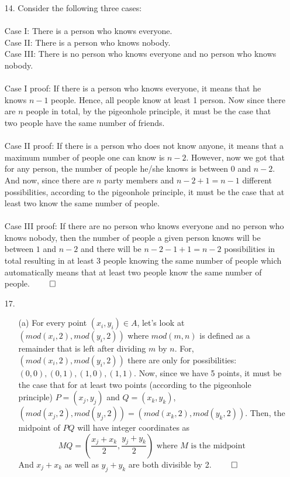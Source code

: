 \documentclass[12pt, a4paper]{article}
\begin{document}
\begin{itemize}
\item[]

\item[14.]
Consider the following three cases:\\\\
Case I: There is a person who knows everyone.\\
Case II: There is a person who knows nobody.\\
Case III: There is no person who knows everyone and no person who knows nobody.
\\\\
Case I proof: If there is a person who knows everyone, it means that he knows $n - 1$ people. Hence, all people know at least 1 person. Now since there are $n$ people in total, by the pigeonhole principle, it must be the case that two people have the same number of friends. \\\\
Case II proof: If there is a person who does not know anyone, it means that a maximum number of people one can know is $n - 2$. However, now we got that for any person, the number of people he/she knows is between
0 and $n - 2$. And now, since there are $n$ party members and $n - 2 + 1 = n - 1$ different possibilities, according to the pigeonhole principle, it must be the case that at least two know the same number of people.
\\\\
Case III proof: If there are no person who knows everyone and no person who knows nobody, then the number of people a given person knows will be between $1$ and $n - 2$ and there will be $n - 2 - 1 + 1 = n - 2$ possibilities in total
resulting in at least 3 people knowing the same number of people which automatically means that at least two people know the same number of people.
$\qed$

\item[]

\item[17.]
\begin{itemize}
\item[(a)]
For every point $(x_i, y_i) \in A$, let's look at $(mod(x_i, 2), mod(y_i, 2))$
where $mod(m,n)$ is defined as a remainder that is left after dividing $m$ by $n$.
For, $(mod(x_i, 2), mod(y_i, 2))$ there are only for possibilities: $(0, 0), (0, 1), (1, 0), (1, 1)$.
Now, since we have 5 points, it must be the case that for at least two points (according to the pigeonhole principle)
$P = (x_j, y_j)$ and $Q = (x_k, y_k)$, $(mod(x_j, 2), mod(y_j, 2)) = (mod(x_k, 2), mod(y_k, 2))$. Then, the midpoint
of $PQ$ will have integer coordinates as
$$MQ = (\dfrac{x_j + x_k}{2}, \dfrac{y_j + y_k}{2}) \mbox{ where $M$ is the midpoint}$$
And $x_j + x_k$ as well as $y_j + y_k$ are both divisible by 2.
$\qed$
\end{itemize}


\end{itemize}
\end{document}
